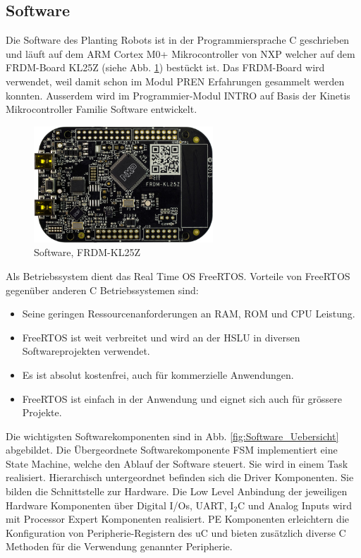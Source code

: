 \subsection{Software} \label{kap:Software}

Die Software des Planting Robots ist in der Programmiersprache C geschrieben und läuft auf dem ARM Cortex M0+ Mikrocontroller von NXP welcher auf dem FRDM-Board KL25Z (siehe Abb. \ref{fig:FRDM-KL25Z}) bestückt ist. Das FRDM-Board wird verwendet, weil damit schon im Modul PREN Erfahrungen gesammelt werden konnten. Ausserdem wird im Programmier-Modul INTRO auf Basis der Kinetis Mikrocontroller Familie Software entwickelt.

\begin{figure}[H]
	\includegraphics[width=0.6\textwidth]{Illustrationen/5-Konzept/FRDM-KL25Z.jpg}
	\caption{Software, FRDM-KL25Z \protect\cite{NXP}}
	\label{fig:FRDM-KL25Z}
\end{figure}

Als Betriebssystem dient das Real Time OS FreeRTOS. Vorteile von FreeRTOS gegenüber anderen C Betriebssystemen sind:

\begin{itemize}
	\item Seine geringen Ressourcenanforderungen an RAM, ROM und CPU Leistung. 
	\item FreeRTOS ist weit verbreitet und wird an der HSLU in diversen Softwareprojekten verwendet.
	\item Es ist absolut kostenfrei, auch für kommerzielle Anwendungen.
	\item FreeRTOS ist einfach in der Anwendung und eignet sich auch für grössere Projekte.
\end{itemize}

Die wichtigsten Softwarekomponenten sind in Abb. \ref{fig:Software_Uebersicht} abgebildet. Die Übergeordnete Softwarekomponente FSM implementiert eine State Machine, welche den Ablauf der Software steuert. Sie wird in einem Task realisiert. Hierarchisch untergeordnet befinden sich die Driver Komponenten. Sie bilden die Schnittstelle zur Hardware. Die Low Level Anbindung der jeweiligen Hardware Komponenten über Digital I/Os, UART, I$_{2}$C und Analog Inputs wird mit Processor Expert Komponenten realisiert. PE Komponenten erleichtern die Konfiguration von Peripherie-Registern des uC und bieten zusätzlich diverse C Methoden für die Verwendung genannter Peripherie. 

